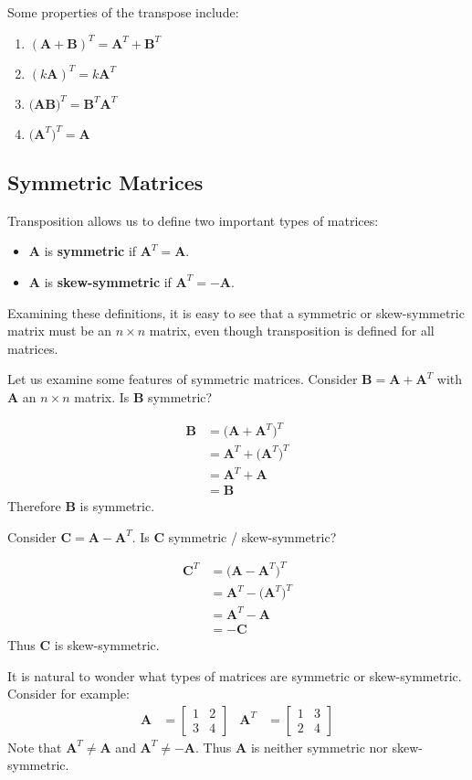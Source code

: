 \documentclass[11pt]{article}
\newcommand{\keyphrase}{\textbf}
\newcommand{\mat}[1]{\mathbf{#1}}
\begin{document}
Some properties of the transpose include:
\begin{enumerate}
\item{
$(\mat{A}+\mat{B})^T = \mat{A}^T + \mat{B}^T$
}
\item{
$(k\mat{A})^T = k \mat{A}^T$
}
\item{
$\Big( \mat{A} \mat{B} \Big)^T = \mat{B}^T \mat{A}^T$
}
\item{
$\Big( \mat{A}^T \Big)^T = \mat{A}$
}
\end{enumerate}

\subsection*{Symmetric Matrices}
Transposition allows us to define two important types of matrices:

\begin{itemize}
\item{
$\mat{A}$ is \keyphrase{symmetric} if $\mat{A}^T = \mat{A}$.
}
\item{
$\mat{A}$ is \keyphrase{skew-symmetric} if $\mat{A}^T = -\mat{A}$.
}
\end{itemize}
Examining these definitions, it is easy to see that a symmetric or skew-symmetric matrix must be an $n \times n$ matrix, even though transposition is defined for all matrices.

Let us examine some features of symmetric matrices. Consider $\mat{B} = \mat{A} + \mat{A}^T$ with $\mat{A}$ an $n \times n$ matrix. Is $\mat{B}$ symmetric?

\begin{align*}
\mat{B} &= \Big( \mat{A} + \mat{A}^T \Big)^T
\\
&= \mat{A}^T + \Big( \mat{A}^T \Big)^T
\\
&= \mat{A}^T + \mat{A}
\\
&= \mat{B}
\end{align*}
Therefore $\mat{B}$ is symmetric.

Consider $\mat{C} = \mat{A} - \mat{A}^T$. Is $\mat{C}$ symmetric / skew-symmetric?

\begin{align*}
\mat{C}^T &= \Big( \mat{A} - \mat{A}^T \Big)^T
\\
&= \mat{A}^T - \Big( \mat{A}^T \Big)^T
\\
&= \mat{A}^T - \mat{A}
\\
&= -\mat{C}
\end{align*}
Thus $\mat{C}$ is skew-symmetric.

It is natural to wonder what types of matrices are symmetric or skew-symmetric. Consider for example:
\begin{align*}
\mat{A} &= \begin{bmatrix}1 & 2 \\ 3 & 4\end{bmatrix}
&
\mat{A}^T &= \begin{bmatrix}1 & 3 \\ 2 & 4\end{bmatrix}
\end{align*}
Note that $\mat{A}^T \neq \mat{A}$ and $\mat{A}^T \neq -\mat{A}$. Thus $\mat{A}$ is neither symmetric nor skew-symmetric.
\end{document}
